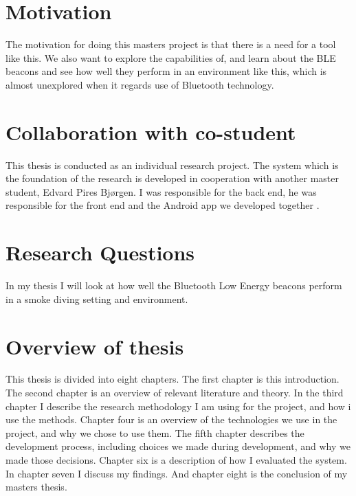 \documentclass[../Main/thesis.tex]{subfiles}
\begin{document}
\section{Motivation}
The motivation for doing this masters project is that there is a need for a tool like this.
We also want to explore the capabilities of, and learn about the BLE beacons and see how well they perform in an environment like this, which is almost unexplored when it regards use of Bluetooth technology. 

\section{Collaboration with co-student}
This thesis is conducted as an individual research project.
The system which is the foundation of the research is developed in cooperation with another master student, Edvard Pires Bjørgen.
I was responsible for the back end, he was responsible for the front end and the Android app we developed together \citep{Bjorgen2018}.  

\section{Research Questions}
In my thesis I will look at how well the Bluetooth Low Energy beacons perform in a smoke diving setting and environment. 


\section{Overview of thesis}
This thesis is divided into eight chapters.
The first chapter is this introduction.
The second chapter is an overview of relevant literature and theory.
In the third chapter I describe the research methodology I am using for the project, and how i use the methods.
Chapter four is an overview of the technologies we use in the project, and why we chose to use them.
The fifth chapter describes the development process, including choices we made during development, and why we made those decisions.
Chapter six is a description of how I evaluated the system.
In chapter seven I discuss my findings.
And chapter eight is the conclusion of my masters thesis.

\onlyinsubfile{}
\onlyinsubfile{}
\end{document}
